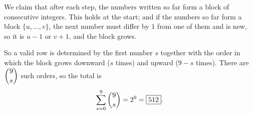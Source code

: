 We claim that after each step, the numbers written so far form a block of consecutive integers. This holds at the start; and if the numbers so far form a block $\{u,\dots,v\}$, the next number must differ by $1$ from one of them and is new, so it is $u-1$ or $v+1$, and the block grows.

So a valid row is determined by the first number $s$ together with the order in which the block grows downward ($s$ times) and upward ($9-s$ times). There are $\dbinom{9}{s}$ such orders, so the total is
\[\sum_{s=0}^{9}\dbinom9s=2^9=\boxed{512}.\]
